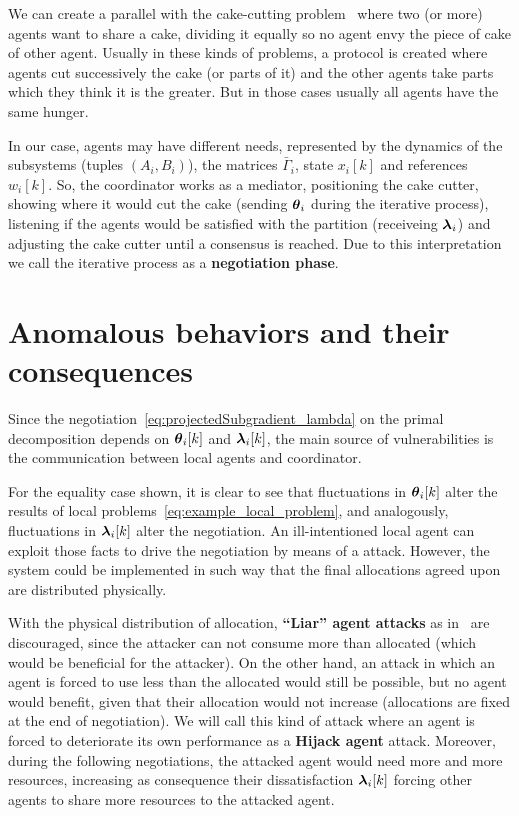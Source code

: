 \documentclass[../main.tex]{subfiles}
\begin{document}
We can create a parallel with the cake-cutting problem~\cite{BramsTaylor1995} where two (or more) agents want to share a cake, dividing it equally so no agent envy the piece of cake of other agent.
Usually in these kinds of problems, a protocol is created where agents cut successively the cake (or parts of it) and the other agents take parts which they think it is the greater.
But in those cases usually all agents have the same hunger.

In our case, agents may have different needs, represented by the dynamics of the subsystems (tuples $(A_{i},B_{i})$), the matrices $\bar{\Gamma}_{i}$, state $x_{i}[k]$ and references $w_{i}[k]$.
So, the coordinator works as a mediator, positioning the cake cutter, showing where it would cut the cake (sending $\boldsymbol{\theta}_i$ during the iterative process), listening if the agents would be satisfied with the partition (receiveing $\boldsymbol{\lambda}_i$) and adjusting the cake cutter until a consensus is reached.
Due to this interpretation we call the iterative process as a \textbf{negotiation phase}.



\section[Anomalous behaviors and their consequences]{Anomalous behaviors and their consequences}\label{sec:vulnerabilities_PD}

Since the negotiation~\eqref{eq:projectedSubgradient_lambda} on the primal decomposition depends on $\thetaik$ and $\lambdaik$, the main source of vulnerabilities is the communication between local agents and coordinator.

For the equality case shown, it is clear to see that fluctuations in $\thetaik$ alter the results of local problems~\eqref{eq:example_local_problem}, and analogously, fluctuations in $\lambdaik$ alter the negotiation.
An ill-intentioned local agent can exploit those facts to drive the negotiation by means of a \fdi{} attack.
However, the system could be implemented in such way that the final allocations agreed upon are distributed physically.

With the physical distribution of allocation, \textbf{``Liar'' agent attacks} as in~\cite{VelardeEtAl2017b} are discouraged, since the attacker can not consume more than allocated (which would be beneficial for the attacker).
On the other hand, an attack in which an agent is forced to use less than the allocated would still be possible, but no agent would benefit, given that their allocation would not increase (allocations are fixed at the end of negotiation).
We will call this kind of attack where an agent is forced to deteriorate its own performance as a \textbf{Hijack agent} attack.
Moreover, during the following negotiations, the attacked agent would need more and more resources, increasing as consequence their dissatisfaction $\lambdaik$ forcing other agents to share more resources to the attacked agent.
\end{document}
